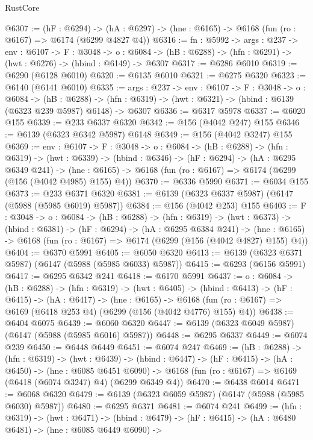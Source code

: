 \begin{lexlean}{RustCore}
\begin{coremodule}
@6307 := (hF : @6294) ->
  (hA : @6297) -> (hne : @6165) -> @6168 (fun (ro : @6167) => @6174 (@6299 @4827 @4))
@6316 := {fn : @5992} ->
  {args : @237} ->
  {env : @6107} ->
  {F : @3048} ->
  {o : @6084} -> (hB : @6288) -> (hfn : @6291) -> (hwt : @6276) -> (hbind : @6149) -> @6307
@6317 := @6286 @6010
@6319 := @6290 (@6128 @6010)
@6320 := @6135 @6010
@6321 := @6275 @6320
@6323 := @6140 (@6141 @6010)
@6335 := {args : @237} ->
  {env : @6107} ->
  {F : @3048} ->
  {o : @6084} ->
  (hB : @6288) ->
  (hfn : @6319) -> (hwt : @6321) -> (hbind : @6139 (@6323 @239 @5987) @6148) -> @6307
@6336 := @6317 @5978
@6337 := @6020 @155
@6339 := @233 @6337 @6320
@6342 := @156 (@4042 @247) @155
@6346 := @6139 (@6323 @6342 @5987) @6148
@6349 := @156 (@4042 @3247) @155
@6369 := {env : @6107} ->
  {F : @3048} ->
  {o : @6084} ->
  (hB : @6288) ->
  (hfn : @6319) ->
  (hwt : @6339) ->
  (hbind : @6346) ->
  (hF : @6294) ->
  (hA : @6295 @6349 @241) ->
  (hne : @6165) -> @6168 (fun (ro : @6167) => @6174 (@6299 (@156 (@4042 @4985) @155) @4))
@6370 := @6336 @5990
@6371 := @6034 @155
@6373 := @233 @6371 @6320
@6381 := @6139 (@6323 @6337 @5987) (@6147 (@5988 (@5985 @6019) @5987))
@6384 := @156 (@4042 @253) @155
@6403 := {F : @3048} ->
  {o : @6084} ->
  (hB : @6288) ->
  (hfn : @6319) ->
  (hwt : @6373) ->
  (hbind : @6381) ->
  (hF : @6294) ->
  (hA : @6295 @6384 @241) ->
  (hne : @6165) -> @6168 (fun (ro : @6167) => @6174 (@6299 (@156 (@4042 @4827) @155) @4))
@6404 := @6370 @5991
@6405 := @6050 @6320
@6413 := @6139 (@6323 @6371 @5987) (@6147 (@5988 (@5985 @6033) @5987))
@6415 := @6293 (@6156 @5991)
@6417 := @6295 @6342 @241
@6418 := @6170 @5991
@6437 := {o : @6084} ->
  (hB : @6288) ->
  (hfn : @6319) ->
  (hwt : @6405) ->
  (hbind : @6413) ->
  (hF : @6415) ->
  (hA : @6417) ->
  (hne : @6165) ->
  @6168 (fun (ro : @6167) => @6169 (@6418 @253 @4) (@6299 (@156 (@4042 @4776) @155) @4))
@6438 := @6404 @6075
@6439 := @6060 @6320
@6447 := @6139 (@6323 @6049 @5987) (@6147 (@5988 (@5985 @6016) @5987))
@6448 := @6295 @6337
@6449 := @6074 @239
@6450 := @6448 @6449
@6451 := @6074 @247
@6469 := (hB : @6288) ->
  (hfn : @6319) ->
  (hwt : @6439) ->
  (hbind : @6447) ->
  (hF : @6415) ->
  (hA : @6450) ->
  (hne : @6085 @6451 @6090) ->
  @6168 (fun (ro : @6167) => @6169 (@6418 (@6074 @3247) @4) (@6299 @6349 @4))
@6470 := @6438 @6014
@6471 := @6068 @6320
@6479 := @6139 (@6323 @6059 @5987) (@6147 (@5988 (@5985 @6030) @5987))
@6480 := @6295 @6371
@6481 := @6074 @241
@6499 := (hfn : @6319) ->
  (hwt : @6471) ->
  (hbind : @6479) ->
  (hF : @6415) ->
  (hA : @6480 @6481) ->
  (hne : @6085 @6449 @6090) ->

\end{coremodule}
\end{lexlean}
